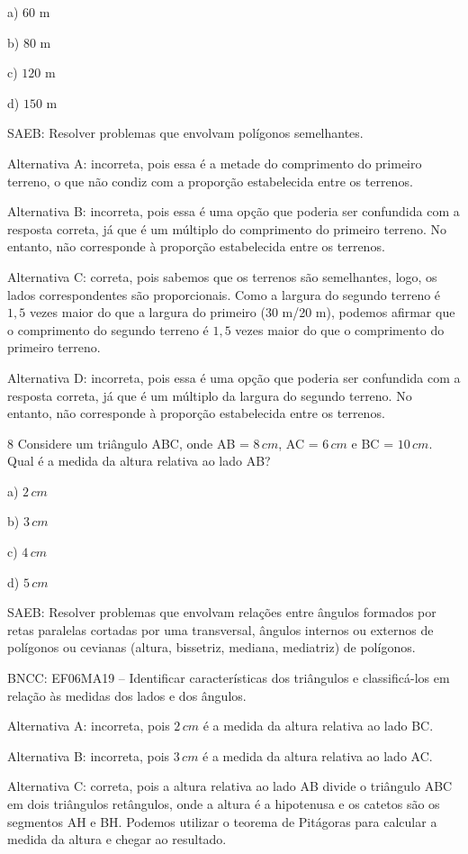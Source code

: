 a) $60$ m

b) $80$ m

c) $120$ m

d) $150$ m

SAEB: Resolver problemas que envolvam polígonos semelhantes.

Alternativa A: incorreta, pois essa é a metade do comprimento do
primeiro terreno, o que não condiz com a proporção estabelecida entre os
terrenos.

Alternativa B: incorreta, pois essa é uma opção que poderia ser
confundida com a resposta correta, já que é um múltiplo do comprimento
do primeiro terreno. No entanto, não corresponde à proporção
estabelecida entre os terrenos.

Alternativa C: correta, pois sabemos que os terrenos são semelhantes,
logo, os lados correspondentes são proporcionais. Como a largura do
segundo terreno é $1,5$ vezes maior do que a largura do primeiro (30 m/20
m), podemos afirmar que o comprimento do segundo terreno é $1,5$ vezes
maior do que o comprimento do primeiro terreno.

Alternativa D: incorreta, pois essa é uma opção que poderia ser
confundida com a resposta correta, já que é um múltiplo da largura do
segundo terreno. No entanto, não corresponde à proporção estabelecida
entre os terrenos.

\num{8}  Considere um triângulo ABC, onde AB = $8\,cm$, AC = $6\,cm$ e BC = $10\,cm$.
Qual é a medida da altura relativa ao lado AB?

a) $2\,cm$

b) $3\,cm$

c) $4\,cm$

d) $5\,cm$

SAEB: Resolver problemas que envolvam relações entre ângulos formados
por retas paralelas cortadas por uma transversal, ângulos internos ou
externos de polígonos ou cevianas (altura, bissetriz, mediana,
mediatriz) de polígonos.

BNCC: EF06MA19 -- Identificar características dos triângulos e
classificá-los em relação às medidas dos lados e dos ângulos.

Alternativa A: incorreta, pois $2\,cm$ é a medida da altura relativa ao
lado BC.

Alternativa B: incorreta, pois $3\,cm$ é a medida da altura relativa ao
lado AC.

Alternativa C: correta, pois a altura relativa ao lado AB divide o
triângulo ABC em dois triângulos retângulos, onde a altura é a
hipotenusa e os catetos são os segmentos AH e BH. Podemos utilizar o
teorema de Pitágoras para calcular a medida da altura e chegar ao
resultado.

